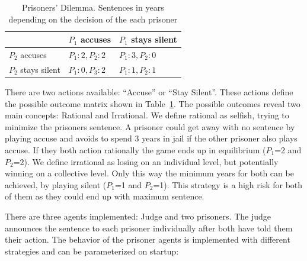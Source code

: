 \documentclass{acm_proc_article-sp}
\begin{document}
\begin{table}
\centering
\begin{tabular}{l | l | l}
                     & $P_1$ accuses    & $P_1$ stays silent\\
  \hline
  $P_2$ accuses      & $P_1: 2, P_2: 2$ & $P_1: 3, P_2: 0$ \\
  \hline
  $P_2$ stays silent & $P_1: 0, P_3: 2$ & $P_1: 1, P_2: 1$ \\
\end{tabular}
\caption{Prisoners' Dilemma. Sentences in years depending on the decision of the each prisoner}
\label{tab:prisoner-opt}
\end{table}

There are two actions available: ``Accuse'' or ``Stay Silent''. These actions define the possible outcome matrix shown in Table~\ref{tab:prisoner-opt}.
The possible outcomes reveal two main concepts: Rational and Irrational.
We define rational as selfish, trying to minimize the prisoners sentence.
A prisoner could get away with no sentence by playing accuse and avoids to spend 3 years in jail if the other prisoner also plays accuse.
If they both action rationally the game ends up in equilibrium ($P_1$=2 and $P_2$=2). 
We define irrational as losing on an individual level, but potentially winning on a collective level. Only this way the minimum years
for both can be achieved, by playing silent ($P_1$=1 and $P_2$=1).
This strategy is a high risk for both of them as they could end up with maximum sentence.

There are three agents implemented: Judge and two prisoners.
The judge announces the sentence 
to each prisoner individually after both have told them their action.
The behavior of the prisoner agents is implemented with different strategies and can be parameterized on startup:
\end{document}
